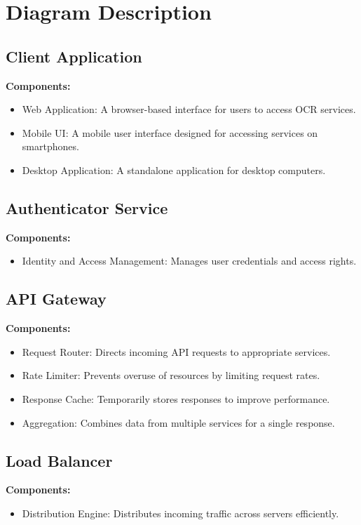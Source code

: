 \documentclass{article}
\begin{document}
\section{Diagram Description}
\subsection{Client Application}
\textbf{Components:}
\begin{itemize}
    \item Web Application: A browser-based interface for users to access OCR services.
    \item Mobile UI: A mobile user interface designed for accessing services on smartphones.
    \item Desktop Application: A standalone application for desktop computers.
\end{itemize}

\subsection{Authenticator Service}
\textbf{Components:}
\begin{itemize}
    \item Identity and Access Management: Manages user credentials and access rights.
\end{itemize}

\subsection{API Gateway}
\textbf{Components:}
\begin{itemize}
    \item Request Router: Directs incoming API requests to appropriate services.
    \item Rate Limiter: Prevents overuse of resources by limiting request rates.
    \item Response Cache: Temporarily stores responses to improve performance.
    \item Aggregation: Combines data from multiple services for a single response.
\end{itemize}

\subsection{Load Balancer}
\textbf{Components:}
\begin{itemize}
    \item Distribution Engine: Distributes incoming traffic across servers efficiently.
\end{itemize}
\end{document}
